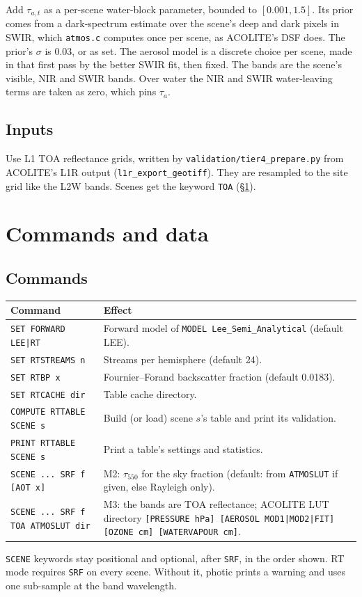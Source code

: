 \documentclass[11pt]{article}
\numberwithin{equation}{section}
\newcommand{\code}[1]{\texttt{#1}}
\begin{document}
Add $\tau_{a,t}$ as a per-scene water-block parameter, bounded to $[0.001, 1.5]$. Its prior
comes from a dark-spectrum estimate over the scene's deep and dark pixels in SWIR, which
\code{atmos.c} computes once per scene, as ACOLITE's DSF does. The prior's $\sigma$ is 0.03,
or as set. The aerosol model is a discrete choice per scene, made in that first pass by the
better SWIR fit, then fixed. The bands are the scene's visible, NIR and SWIR bands. Over water
the NIR and SWIR water-leaving terms are taken as zero, which pins $\tau_a$.

\subsection{Inputs}

Use L1 TOA reflectance grids, written by \code{validation/tier4\_prepare.py} from ACOLITE's L1R
output (\code{l1r\_export\_geotiff}). They are resampled to the site grid like the L2W bands.
Scenes get the keyword \code{TOA} (\S\ref{sec:commands}).

\section{Commands and data}\label{sec:commands}\label{sec:data}

\subsection{Commands}

\begin{longtable}{@{}p{6.4cm}p{8cm}@{}}
\toprule
Command & Effect\\
\midrule
\endhead
\code{SET FORWARD LEE|RT} & Forward model of \code{MODEL Lee\_Semi\_Analytical} (default LEE).\\
\code{SET RTSTREAMS n} & Streams per hemisphere (default 24).\\
\code{SET RTBP x} & Fournier--Forand backscatter fraction (default 0.0183).\\
\code{SET RTCACHE dir} & Table cache directory.\\
\code{COMPUTE RTTABLE SCENE s} & Build (or load) scene $s$'s table and print its validation.\\
\code{PRINT RTTABLE SCENE s} & Print a table's settings and statistics.\\
\code{SCENE ... SRF f [AOT x]} & M2: $\tau_{550}$ for the sky fraction (default: from \code{ATMOSLUT}
if given, else Rayleigh only).\\
\code{SCENE ... SRF f TOA ATMOSLUT dir} & M3: the bands are TOA reflectance; ACOLITE LUT directory
\code{[PRESSURE hPa] [AEROSOL MOD1|MOD2|FIT] [OZONE cm] [WATERVAPOUR cm]}.\\
\bottomrule
\end{longtable}
\code{SCENE} keywords stay positional and optional, after \code{SRF}, in the order shown. RT mode
requires \code{SRF} on every scene. Without it, photic prints a warning and uses one
sub-sample at the band wavelength.
\end{document}
